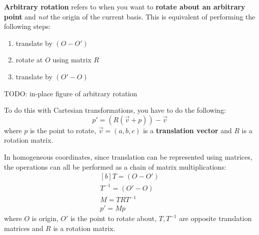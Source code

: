 \documentclass{article}
\begin{document}
\textbf{Arbitrary rotation} refers to when you want to \textbf{rotate about an arbitrary point} and \textit{not} the origin of the current basis. This is equivalent of performing the following steps:
\begin{enumerate}
	\item translate by $(O - O')$
	\item rotate at $O$ using matrix $R$
	\item translate by $(O' - O)$
\end{enumerate}

TODO: in-place figure of arbitrary rotation

To do this with Cartesian transformations, you have to do the following:
\begin{equation}
	p' = (R(\vec{v} + p)) - \vec{v}
\end{equation}
where $p$ is the point to rotate, $\vec{v} = (a, b, c)$ is a \textbf{translation vector}  and $R$ is a rotation matrix.

In homogeneous coordinates, since translation can be represented using matrices, the operations can all be performed as a chain of matrix multiplications:
\begin{equation}
\begin{aligned}[b]
	T = (O - O') \\
	T^{-1} = (O' - O) \\
	M = TRT^{-1} \\
	p' = Mp
\end{aligned}
	\label{eq:homogeneous-arbitrary-point-rotation}
\end{equation}
where $O$ is origin, $O'$ is the point to rotate about, $T,T^{-1}$ are opposite translation matrices and $R$ is a rotation matrix.
\end{document}
